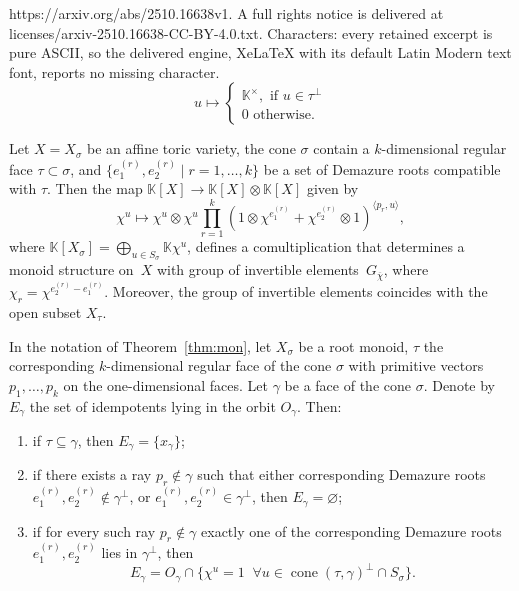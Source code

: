 \documentclass[10pt,a4paper]{amsart}
\DeclareMathOperator{\cone}{cone}
\newcommand{\GG}{G_{\overline{\chi}}}
\newcommand{\KK}{\mathbb{K}}
\begin{document}
https://arxiv.org/abs/2510.16638v1. A full rights notice is delivered at licenses/arxiv-2510.16638-CC-BY-4.0.txt. Characters: every retained excerpt is pure ASCII, so the delivered engine, XeLaTeX with its default Latin Modern text font, reports no missing character.
\begin{equation}\label{tor:fun_orb2}
	u \mapsto \begin{cases} 
		\KK^\times, \text{ if } u \in \tau^\perp\\
		0 \text{ otherwise.} 
	\end{cases}
\end{equation}

\begin{theorem}\label{thm:mon}
Let $X = X_\sigma$ be an affine toric variety, the cone $\sigma$ contain a $k$-dimensional regular face $\tau \subset \sigma$, and $\{e_1^{(r)}, e_2^{(r)} \mid r = 1,\ldots,k\}$ be a set of Demazure roots compatible with $\tau$. Then the map $\KK[X] \rightarrow \KK[X] \otimes \KK[X]$ given by
\begin{equation}\label{thm:finalcom}
	\chi^u \mapsto \chi^u \otimes \chi^u \prod_{r = 1}^{k} (1 \otimes \chi^{e_1^{(r)}} + \chi^{e_2^{(r)}} \otimes 1)^{\langle p_r, u\rangle},
\end{equation}
where $\KK[X_\sigma] = \bigoplus_{u \in S_\sigma} \KK \chi^u$, defines a comultiplication that determines a monoid structure on~$X$ with group of invertible elements~$\GG$, where $\chi_r = \chi^{e_2^{(r)} - e_1^{(r)}}$. Moreover, the group of invertible elements coincides with the open subset $X_\tau$.
\end{theorem}

\begin{theorem}\label{idem_thm_1}
	In the notation of Theorem~\ref{thm:mon}, let $X_\sigma$ be a root monoid, $\tau$ the corresponding $k$-dimensional regular face of the cone $\sigma$ with primitive vectors $p_1, \ldots, p_k$ on the one-dimensional faces. Let $\gamma$ be a face of the cone $\sigma$. Denote by $E_\gamma$ the set of idempotents lying in the orbit $O_\gamma$. Then:
	\begin{enumerate}
		\item if $\tau \subseteq \gamma$, then $E_\gamma = \{x_\gamma \}$; 
		\item if there exists a ray $p_r \notin \gamma$ such that either corresponding Demazure roots $e_1^{(r)}, e_2^{(r)} \notin \gamma^\perp$, or $e_1^{(r)}, e_2^{(r)} \in \gamma^\perp$, then $E_\gamma = \varnothing$;
		\item if for every such ray $p_r \notin \gamma$ exactly one of the corresponding Demazure roots $e_1^{(r)}, e_2^{(r)}$ lies in $\gamma^\perp$, then \[E_\gamma = O_\gamma \cap \{\chi^u = 1\;\; \forall u \in \cone(\tau, \gamma)^\perp \cap S_\sigma\}.\]
	\end{enumerate}
\end{theorem}
\end{document}
